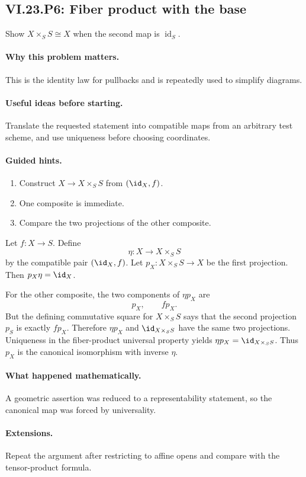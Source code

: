 \subsection*{VI.23.P6: Fiber product with the base}
\begin{problem}\label{prob:vi23-p06}
Show $X\times_SS\cong X$ when the second map is $\operatorname{id}_S$.
\end{problem}

\ifdefined\FullProblemDossiers
\paragraph{Why this problem matters.}
This is the identity law for pullbacks and is repeatedly used to simplify diagrams.

\paragraph{Useful ideas before starting.}
Translate the requested statement into compatible maps from an arbitrary test scheme, and use uniqueness before choosing coordinates.

\paragraph{Guided hints.}
\begin{enumerate}
\item Construct $X\to X\times_SS$ from $(\id_X,f)$.
\item One composite is immediate.
\item Compare the two projections of the other composite.
\end{enumerate}

\begin{solution}
Let $f:X\to S$.  Define
\[
\eta:X\to X\times_SS
\]
by the compatible pair $(\id_X,f)$.  Let $p_X:X\times_SS\to X$ be the first projection.
Then $p_X\eta=\id_X$.

For the other composite, the two components of $\eta p_X$ are
\[
p_X,\qquad f p_X.
\]
But the defining commutative square for $X\times_SS$ says that the second projection
$p_S$ is exactly $f p_X$.  Therefore $\eta p_X$ and $\id_{X\times_SS}$ have the same two
projections.  Uniqueness in the fiber-product universal property yields
$\eta p_X=\id_{X\times_SS}$.  Thus $p_X$ is the canonical isomorphism with inverse $\eta$.
\end{solution}

\paragraph{What happened mathematically.}
A geometric assertion was reduced to a representability statement, so the canonical map was forced by universality.

\paragraph{Extensions.}
Repeat the argument after restricting to affine opens and compare with the tensor-product formula.
\fi
